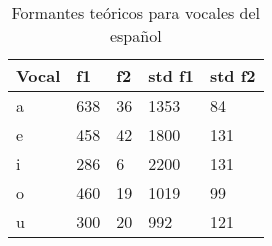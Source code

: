 \begin{table}[H]
\centering
\caption{Formantes teóricos para vocales del español \cite{Bradlow1995}}
\label{tab:formantes_teoricos}
\begin{tabular}{|l|l|l|l|l|}
\textbf{Vocal} & \textbf{f1} & \textbf{f2} & \textbf{std f1} & \textbf{std f2} \\ \hline
a   & 638 & 36 & 1353 & 84 \\ \hline
e   & 458 & 42 & 1800 & 131 \\ \hline
i   & 286 & 6  & 2200 & 131 \\ \hline
o   & 460 & 19 & 1019 & 99 \\ \hline
u   & 300 & 20 & 992  & 121 \\ \hline

\end{tabular}
\end{table}